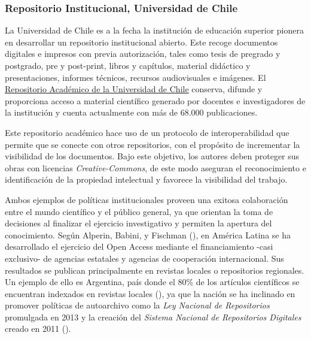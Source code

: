 \documentclass[
  spanish,
  a4paper,
  oneside]{scrbook}
\begin{document}
\subsubsection*{\texorpdfstring{\textbf{Repositorio Institucional,
Universidad de
Chile}}{Repositorio Institucional, Universidad de Chile}}\label{repositorio-institucional-universidad-de-chile}

La Universidad de Chile es a la fecha la institución de educación
superior pionera en desarrollar un repositorio institucional abierto.
Este recoge documentos digitales e impresos con previa autorización,
tales como tesis de pregrado y postgrado, pre y post-print, libros y
capítulos, material didáctico y presentaciones, informes técnicos,
recursos audiovisuales e imágenes. El
\href{http://repositorio.uchile.cl/}{Repositorio Académico de la
Universidad de Chile} conserva, difunde y proporciona acceso a material
científico generado por docentes e investigadores de la institución y
cuenta actualmente con más de 68.000 publicaciones.

Este repositorio académico hace uso de un protocolo de interoperabilidad
que permite que se conecte con otros repositorios, con el propósito de
incrementar la visibilidad de los documentos. Bajo este objetivo, los
autores deben proteger sus obras con licencias \emph{Creative-Commons},
de este modo aseguran el reconocimiento e identificación de la propiedad
intelectual y favorece la visibilidad del trabajo.

Ambos ejemplos de políticas institucionales proveen una exitosa
colaboración entre el mundo científico y el público general, ya que
orientan la toma de decisiones al finalizar el ejercicio investigativo y
permiten la apertura del conocimiento. Según Alperin, Babini, y Fischman
(), en América Latina se ha
desarrollado el ejercicio del Open Access mediante el financiamiento
-casi exclusivo- de agencias estatales y agencias de cooperación
internacional. Sus resultados se publican principalmente en revistas
locales o repositorios regionales. Un ejemplo de ello es Argentina, país
donde el 80\% de los artículos científicos se encuentran indexados en
revistas locales (), ya que la nación se ha inclinado en promover
políticas de autoarchivo como la \emph{Ley Nacional de Repositorios}
promulgada en 2013 y la creación del \emph{Sistema Nacional de
Repositorios Digitales} creado en 2011
().
\end{document}
